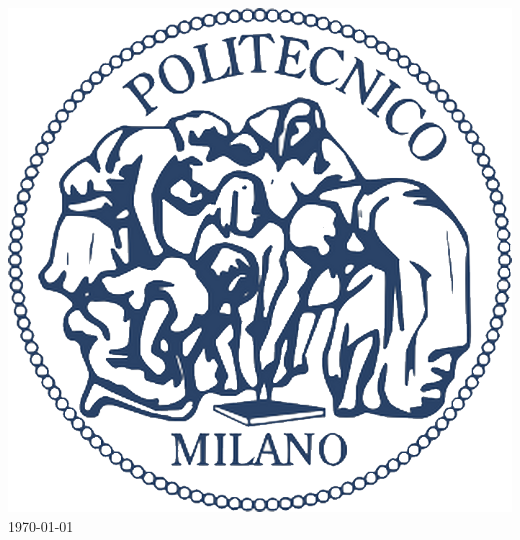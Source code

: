 \documentclass{article}
\begin{document}
\begin{titlepage}
		
		
		
		\includegraphics{Risorse/polimi.png}\\[1cm] %
		
		
		
		{\large \today}\\[3cm] %
		
		
		
		\vfill %
		
	\end{titlepage}
	
\end{document}
